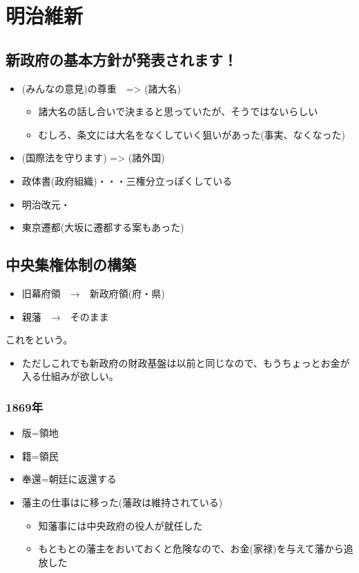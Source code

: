 \documentclass[12pt]{ltjsarticle}
\begin{document}

\section{明治維新}
\subsection{新政府の基本方針が発表されます！}

\begin{itemize}
\item {} (みんなの意見)の尊重　=> (諸大名)
\begin{itemize}
\item 諸大名の話し合いで決まると思っていたが、そうではないらしい
\item むしろ、条文には大名をなくしていく狙いがあった(事実、なくなった)
\end{itemize}
 \item {} (国際法を守ります) => (諸外国)
\item 政体書(政府組織)・・・三権分立っぽくしている
\item 明治改元・
\item 東京遷都(大坂に遷都する案もあった)
\end{itemize}

\subsection{中央集権体制の構築}
\begin{itemize}
\item 旧幕府領　→　新政府領(府・県)
\item 親藩　→　そのまま
\end{itemize}
これをという。
\begin{itemize}
\item ただしこれでも新政府の財政基盤は以前と同じなので、もうちょっとお金が入る仕組みが欲しい。
\end{itemize}
\subsubsection*{1869年 }
\begin{itemize}
\item 版=領地
\item 籍=領民
\item 奉還=朝廷に返還する
\item 藩主の仕事はに移った(藩政は維持されている)
\begin{itemize}
\item 知藩事には中央政府の役人が就任した
\item もともとの藩主をおいておくと危険なので、お金(家禄)を与えて藩から追放した
\end{itemize}
\end{itemize}
\end{document}
